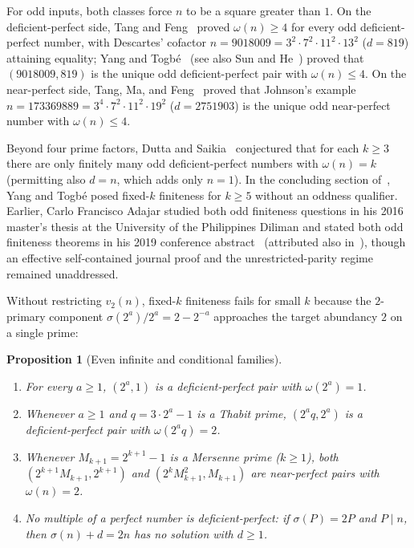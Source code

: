 \documentclass[11pt]{amsart}
\newtheorem{proposition}[theorem]{Proposition}
\theoremstyle{definition}
\theoremstyle{remark}
\begin{document}
For odd inputs, both classes force $n$ to be a square greater than $1$. On the deficient-perfect side, Tang and Feng~\cite{TangFeng2014} proved $\omega(n) \ge 4$ for every odd deficient-perfect number, with Descartes' cofactor $n = 9018009 = 3^2 \cdot 7^2 \cdot 11^2 \cdot 13^2$ ($d = 819$) attaining equality; Yang and Togb\'e~\cite{YangTogbe2023} (see also Sun and He~\cite{SunHe2019}) proved that $(9018009, 819)$ is the unique odd deficient-perfect pair with $\omega(n) \le 4$. On the near-perfect side, Tang, Ma, and Feng~\cite{TangMaFeng2016} proved that Johnson's example $n = 173369889 = 3^4 \cdot 7^2 \cdot 11^2 \cdot 19^2$ ($d = 2751903$) is the unique odd near-perfect number with $\omega(n) \le 4$.

Beyond four prime factors, Dutta and Saikia~\cite[Conj.~3.2]{DuttaSaikia2020} conjectured that for each $k \ge 3$ there are only finitely many odd deficient-perfect numbers with $\omega(n) = k$ (permitting also $d = n$, which adds only $n = 1$). In the concluding section of~\cite{YangTogbe2023}, Yang and Togb\'e posed fixed-$k$ finiteness for $k \ge 5$ without an oddness qualifier. Earlier, Carlo Francisco Adajar studied both odd finiteness questions in his 2016 master's thesis at the University of the Philippines Diliman and stated both odd finiteness theorems in his 2019 conference abstract~\cite{Adajar2019} (attributed also in~\cite[Thm.~3.4.1]{Gumaru2018}), though an effective self-contained journal proof and the unrestricted-parity regime remained unaddressed.

Without restricting $v_2(n)$, fixed-$k$ finiteness fails for small $k$ because the $2$-primary component $\sigma(2^a)/2^a = 2 - 2^{-a}$ approaches the target abundancy $2$ on a single prime:

\begin{proposition}[Even infinite and conditional families]\label{prop:even-families}
\begin{enumerate}
  \item For every $a \ge 1$, $(2^a, 1)$ is a deficient-perfect pair with $\omega(2^a) = 1$.
  \item Whenever $a \ge 1$ and $q = 3 \cdot 2^a - 1$ is a Thabit prime, $(2^a q, 2^a)$ is a deficient-perfect pair with $\omega(2^a q) = 2$.
  \item Whenever $M_{k+1} = 2^{k+1} - 1$ is a Mersenne prime ($k \ge 1$), both $(2^{k+1} M_{k+1}, 2^{k+1})$ and $(2^k M_{k+1}^2, M_{k+1})$ are near-perfect pairs with $\omega(n) = 2$.
  \item No multiple of a perfect number is deficient-perfect: if $\sigma(P) = 2P$ and $P \mid n$, then $\sigma(n) + d = 2n$ has no solution with $d \ge 1$.
\end{enumerate}
\end{proposition}
\end{document}
